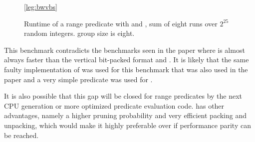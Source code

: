 \begin{figure}[h]
\begin{center}

\ref*{leg:bwvbs}
\end{center}
\caption{Runtime of a range predicate with \bwv{} and \bs{}, sum of eight
runs over $2^{25}$ random integers. \bwv{} group size is eight.}
\label{fig:eval:bwvbs}
\end{figure}

This benchmark contradicts the benchmarks seen in the \bs{} paper
\cite{ByteSlice} where \bs{} is almost always faster than the vertical
bit-packed format and \simdscan{}. It is likely that the same faulty
implementation of \simdscan{} was used for this benchmark that was also used in
the \bwv{} paper and a very simple predicate was used for \bs{}.

It is also possible that this gap will be closed for range predicates by the
next CPU generation or more optimized predicate evaluation code.  \bs{} has
other advantages, namely a higher pruning probability and very efficient packing
and unpacking, which would make it highly preferable over \bwv{} if performance
parity can be reached.

